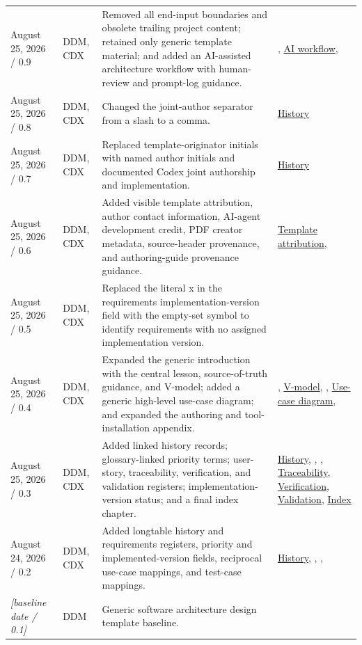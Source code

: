 \begin{tabularx}{\linewidth}{L{3.1cm}L{2.2cm}YL{2.0cm}}
August 25, 2026 / 0.9 & DDM, CDX & Removed all end-input boundaries and obsolete trailing project content; retained only generic template material; and added an AI-assisted architecture workflow with human-review and prompt-log guidance. & , \hyperref[Section:AIArchitectureWorkflow]{AI workflow}, \\
August 25, 2026 / 0.8 & DDM, CDX & Changed the joint-author separator from a slash to a comma. & \hyperref[Table:DocumentHistory]{History}\\
August 25, 2026 / 0.7 & DDM, CDX & Replaced template-originator initials with named author initials and documented Codex joint authorship and implementation. & \hyperref[Table:DocumentHistory]{History}\\
August 25, 2026 / 0.6 & DDM, CDX & Added visible template attribution, author contact information, AI-agent development credit, PDF creator metadata, source-header provenance, and authoring-guide provenance guidance. & \hyperref[Chapter:TemplateAttribution]{Template attribution}, \\
August 25, 2026 / 0.5 & DDM, CDX & Replaced the literal x in the requirements implementation-version field with the empty-set symbol to identify requirements with no assigned implementation version. & \\
August 25, 2026 / 0.4 & DDM, CDX & Expanded the generic introduction with the central lesson, source-of-truth guidance, and V-model; added a generic high-level use-case diagram; and expanded the authoring and tool-installation appendix. & , \hyperref[Figure:VModel]{V-model}, , \hyperref[Figure:UseCaseDiagram]{Use-case diagram}, \\
August 25, 2026 / 0.3 & DDM, CDX & Added linked history records; glossary-linked priority terms; user-story, traceability, verification, and validation registers; implementation-version status; and a final index chapter. & \hyperref[Table:DocumentHistory]{History}, , , \hyperref[Table:TraceabilityMatrix]{Traceability}, \hyperref[Table:VerificationRegister]{Verification}, \hyperref[Table:ValidationRegister]{Validation}, \hyperref[Chapter:Index]{Index}\\
August 24, 2026 / 0.2 & DDM, CDX & Added longtable history and requirements registers, priority and implemented-version fields, reciprocal use-case mappings, and test-case mappings. & \hyperref[Table:DocumentHistory]{History}, , , \\
\textit{[baseline date / 0.1]} & DDM & Generic software architecture design template baseline. & \\
\end{tabularx}
